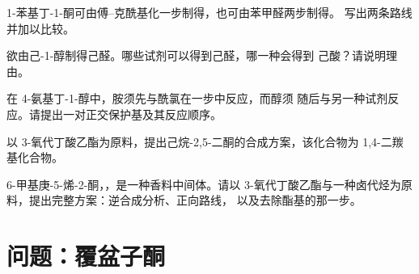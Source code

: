 \begin{exercise}[$\star\star$]\label{exo:b2:retrosynthesis:8}
1-苯基丁-1-酮可由傅–克酰基化一步制得，也可由苯甲醛两步制得。
写出两条路线并加以比较。
\end{exercise}

\begin{exercise}[$\star\star$]\label{exo:b2:retrosynthesis:9}
欲由己-1-醇制得己醛。哪些试剂可以得到己醛，哪一种会得到
己酸？请说明理由。
\end{exercise}

\begin{exercise}[$\star\star\star$]\label{exo:b2:retrosynthesis:10}
在 4-氨基丁-1-醇中，胺须先与酰氯在一步中反应，而醇须
随后与另一种试剂反应。请提出一对正交保护基及其反应顺序。
\end{exercise}

\begin{exercise}[$\star\star\star$]\label{exo:b2:retrosynthesis:11}
以 3-氧代丁酸乙酯为原料，提出己烷-2,5-二酮的合成方案，该化合物为 1,4-二羰基化合物。
\end{exercise}

\begin{exercise}[$\star\star\star$]\label{exo:b2:retrosynthesis:12}
6-甲基庚-5-烯-2-酮，，是一种香料中间体。请以
3-氧代丁酸乙酯与一种卤代烃为原料，提出完整方案：逆合成分析、正向路线，
以及去除酯基的那一步。
\end{exercise}

\section{问题：覆盆子酮}

